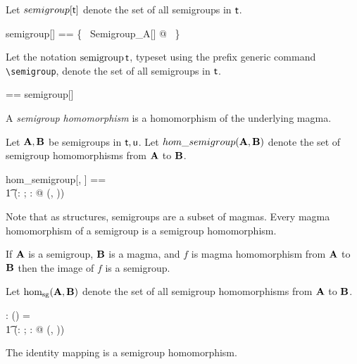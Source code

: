 \documentclass{amsart}
\begin{document}
Let $semigroup[\mathsf{t}]$ denote the set of all semigroups in $\mathsf{t}$.

\begin{zed}
	semigroup[\genT] == \{~ Semigroup\_A[\genT] @ \strucA  ~\}
\end{zed}

Let the notation $\operatorname{semigroup} \mathsf{t}$, typeset using the prefix generic command \verb|\semigroup|,
denote the set of all semigroups in $\mathsf{t}$.

\begin{zed}
	\semigroup \genT == semigroup[\genT]
\end{zed}

\begin{remark}
\begin{zed}
	\semigroup \setT \subseteq \magma \setT
\end{zed}
\end{remark}

A \textit{semigroup homomorphism} is a homomorphism of the underlying magma.

Let $\mathbf{A}, \mathbf{B}$ be semigroups in $\mathsf{t}, \mathsf{u}$.
Let $hom\_semigroup(\mathbf{A}, \mathbf{B})$ denote the set of semigroup homomorphisms from $\mathbf{A}$ to $\mathbf{B}$.

\begin{zed}
	hom\_semigroup[\genT, \genU] == \\
	\t1	(\lambda \strucA: \semigroup \genT; \strucB: \semigroup \genU @ \homMagma(\strucA, \strucB))
\end{zed}

Note that as structures, semigroups are a subset of magmas.
Every magma homomorphism of a semigroup is a semigroup homomorphism.

If $\mathbf{A}$ is a semigroup, $\mathbf{B}$ is a magma, and $f$ is magma homomorphism from 
$\mathbf{A}$ to $\mathbf{B}$ then the image of $f$ is a semigroup.

Let $\operatorname{hom_{sg}}(\mathbf{A}, \mathbf{B})$ denote the set of all semigroup homomorphisms from $\mathbf{A}$ to $\mathbf{B}$.

\begin{gendef}[\genT, \genU]
	\homSemigroup: \semigroup \genT \cross \semigroup \genU \fun \power (\genT \pfun \genU)
\where
	\homSemigroup = \\
	\t1	(\lambda \strucA: \semigroup \genT; \strucB: \semigroup \genU @ \homMagma(\strucA, \strucB))
\end{gendef}

\begin{remark}
The identity mapping is a semigroup homomorphism.
\end{remark}
\end{document}
